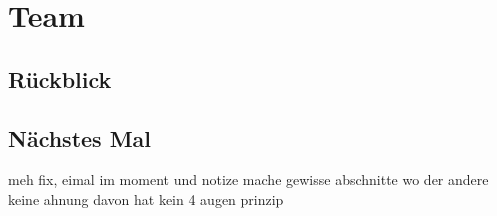 \chapter{Team}

\section*{Rückblick}
\section*{Nächstes Mal}



meh fix, eimal im moment
und notize mache
gewisse abschnitte wo der andere keine ahnung davon hat
kein 4 augen prinzip